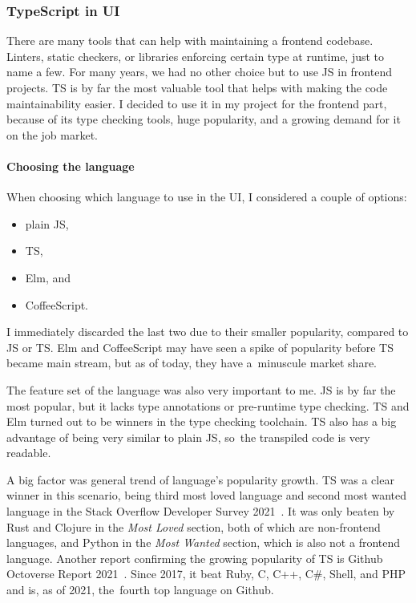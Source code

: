 \subsubsection{TypeScript in UI}\label{sec:typescript-in-ui}

There are many tools that can help with maintaining
a frontend codebase.
Linters,
static checkers,
or libraries enforcing certain type at runtime,
just to name a few.
For many years,
we had no other choice but to use
\ac{JS} in frontend projects.
\Acl{TS} is by far the most valuable tool that helps
with making the code maintainability easier.
I decided to use it in my project for the frontend part,
because of its type checking tools,
huge popularity,
and a growing demand for it on the job market.

\paragraph*{Choosing the language}\label{sec:choosing-the-language}

When choosing which language to use in the \ac{UI},
I considered a couple of options:

\begin{itemize}
      \item
            plain \acl{JS},
      \item
            \acl{TS},
      \item
            Elm, and
      \item
            CoffeeScript.
\end{itemize}

I immediately discarded the last two
due to their smaller popularity,
compared to \acl{JS} or \acl{TS}.
Elm and CoffeeScript may have seen
a spike of popularity before \acl{TS}
became main stream,
but as of today,
they have a~minuscule market share.

The feature set of the language was also very important to me.
\Acl{JS} is by far the most popular,
but it lacks type annotations or pre-runtime type checking.
\Acl{TS} and Elm turned out to be winners in the type checking toolchain.
\Acl{TS} also has a big advantage of being very similar to plain \acl{JS},
so~the transpiled code is very readable.

A big factor was general trend of language's popularity growth.
\Acl{TS} was a clear winner in this scenario,
being third most loved language
and second most wanted language
in the Stack Overflow Developer Survey 2021~\cite{stack_overflow_2021_2021}.
It was only beaten by Rust and Clojure
in the \textit{Most Loved} section,
both of which are non-frontend languages,
and Python in the \textit{Most Wanted} section,
which is also not a frontend language.
Another report confirming the growing popularity of \acl{TS}
is Github Octoverse Report 2021~\cite{github_inc_2021_2021}.
Since 2017,
it beat
Ruby,
C,
C++,
C\#,
Shell, and
\ac{PHP}
and is, as of 2021, the~fourth top language on Github.

